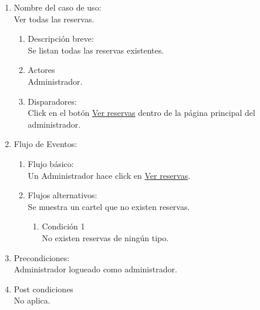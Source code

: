 \documentclass[a4paper,11pt]{article}
\begin{document}
\renewcommand{\theenumiii}{\arabic{enumiii}.}
\renewcommand{\labelenumiii}{\theenumiii}


\begin{enumerate}

    \item Nombre del caso de uso: \\
    Ver todas las reservas.

    \begin{enumerate}
    \item Descripción breve: \\
        Se listan todas las reservas existentes.
    \item Actores \\
        Administrador.
    \item Disparadores: \\
        Click en el botón \underline{Ver reservas} dentro de la
        página principal del administrador.
    \end{enumerate}

    \item Flujo de Eventos: \\

    \begin{enumerate}

        \item Flujo básico:\\
            Un Administrador hace click en \underline{Ver reservas}.
        \item Flujos alternativos:\\
            Se muestra un cartel que no existen reservas.
            \begin{enumerate}
                \item Condición 1 \\
                    No existen reservas de ningún tipo.
            \end{enumerate}

    \end{enumerate}

    \item Precondiciones: \\
        Administrador logueado como administrador.

    \item Post condiciones \\
        No aplica.

\end{enumerate}
\end{document}
